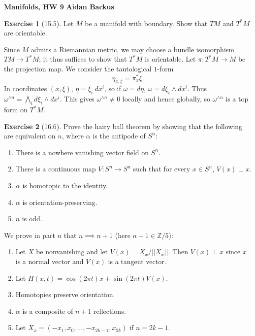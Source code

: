 \documentclass[10pt]{article}
\newcommand{\ZZ}{\mathbb{Z}}
\theoremstyle{definition}
\newtheorem{exer}{Exercise}
\begin{document}
\noindent
\large\textbf{Manifolds, HW 9} \hfill \textbf{Aidan Backus} \\


\begin{exer}[15.5]
Let $M$ be a manifold with boundary. Show that $TM$ and $T^*M$ are orientable.
\end{exer}

Since $M$ admits a Riemannian metric, we may choose a bundle isomorphism $TM \to T^*M$; it thus suffices to show that $T^*M$ is orientable.
Let $\pi: T^*M \to M$ be the projection map.
We consider the tautological $1$-form
$$\eta_{x,\xi} = \pi_x^*\xi.$$
In coordinates $(x, \xi)$, $\eta = \xi_i ~dx^i$, so if $\omega = d\eta$, $\omega = d\xi_i \wedge dx^i$.
Thus $\omega^{\wedge n} = \bigwedge_i d\xi_i \wedge dx^i$.
This gives $\omega^{\wedge n} \neq 0$ locally and hence globally, so $\omega^{\wedge n}$ is a top form on $T^*M$.

\begin{exer}[16.6]
Prove the hairy ball theorem by showing that the following are equivalent on $n$, where $\alpha$ is the antipode of $S^n$:
\begin{enumerate}
\item There is a nowhere vanishing vector field on $S^n$.
\item There is a continuous map $V: S^n \to S^n$ such that for every $x \in S^n$, $V(x) \perp x$.
\item $\alpha$ is homotopic to the identity.
\item $\alpha$ is orientation-preserving.
\item $n$ is odd.
\end{enumerate}
\end{exer}

We prove in part $n$ that $n \implies n + 1$ (here $n - 1\in \ZZ/5$):
\begin{enumerate}
\item Let $X$ be nonvanishing and let $V(x) = X_x/||X_x||$. Then $V(x) \perp x$ since $x$ is a normal vector and $V(x)$ is a tangent vector.
\item Let $H(x, t) = \cos(2\pi t) x + \sin(2\pi t)V(x)$.
\item Homotopies preserve orientation.
\item $\alpha$ is a composite of $n+1$ reflections.
\item Let $X_x = (-x_1, x_0, \dots, -x_{2k-1}, x_{2k})$ if $n = 2k - 1$.
\end{enumerate}
\end{document}
